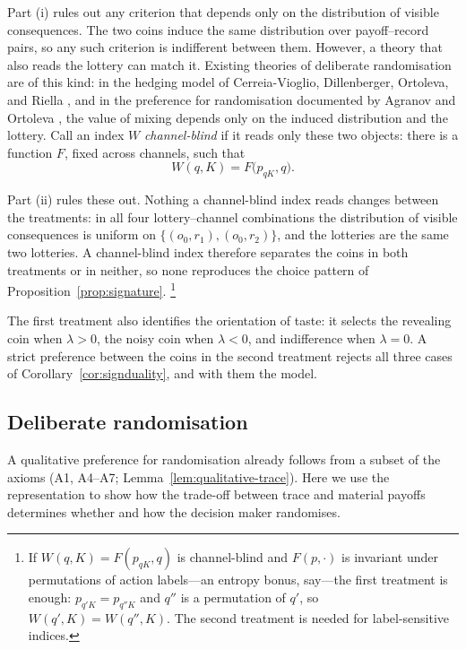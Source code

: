 \documentclass[11pt,a4paper]{article}
\theoremstyle{definition}
\newcommand{\1}{\mathbf 1}
\begin{document}
Part \textup{(i)} rules out any criterion that depends only on the distribution of visible consequences.
The two coins induce the same distribution over payoff--record pairs, so any such criterion is indifferent between them. However, a theory that also reads the lottery can
match it.  Existing theories of deliberate randomisation are of this kind: in the hedging model
of Cerreia-Vioglio, Dillenberger, Ortoleva, and Riella \cite{CerreiaVioglioDillenbergerOrtolevaRiella2019}, and
in the preference for randomisation documented by Agranov and Ortoleva \cite{AgranovOrtoleva2017}, the value of
mixing depends only on the induced distribution and the lottery.  Call an index $W$ \emph{channel-blind} if it
reads only these two objects: there is a function $F$, fixed across channels, such that
\[
 W(q,K)=F\bigl(p_{qK},q\bigr).
\]

Part \textup{(ii)}  rules these out.  Nothing a channel-blind index reads changes between the treatments: in
all four lottery--channel combinations the distribution of visible consequences is uniform on
$\{(o_0,r_1),(o_0,r_2)\}$, and the lotteries are the same two lotteries.  A channel-blind index therefore
separates the coins in both treatments or in neither, so none reproduces the choice pattern of
Proposition~\ref{prop:signature}.%
\footnote{If $W(q,K)=F(p_{qK},q)$ is channel-blind and $F(p,\cdot)$ is invariant under permutations of action labels---an entropy bonus, say---the first
treatment is enough: $p_{q'K}=p_{q''K}$ and $q''$ is a permutation of $q'$, so $W(q',K)=W(q'',K)$.  The second treatment is needed for label-sensitive indices.}

The first treatment also identifies the orientation of taste: it selects the revealing coin when $\lambda>0$,
the noisy coin when $\lambda<0$, and indifference when $\lambda=0$.  A strict preference between the coins in the second treatment rejects all three cases of Corollary~\ref{cor:signduality}, and with them the model.

\subsection{Deliberate randomisation}\label{sec:randomisation}

A qualitative preference for randomisation already follows from a subset of the axioms
(A1, A4--A7; Lemma~\ref{lem:qualitative-trace}).  Here we use the representation to show how the
trade-off between trace and material payoffs determines whether and how the decision maker randomises.
\end{document}
